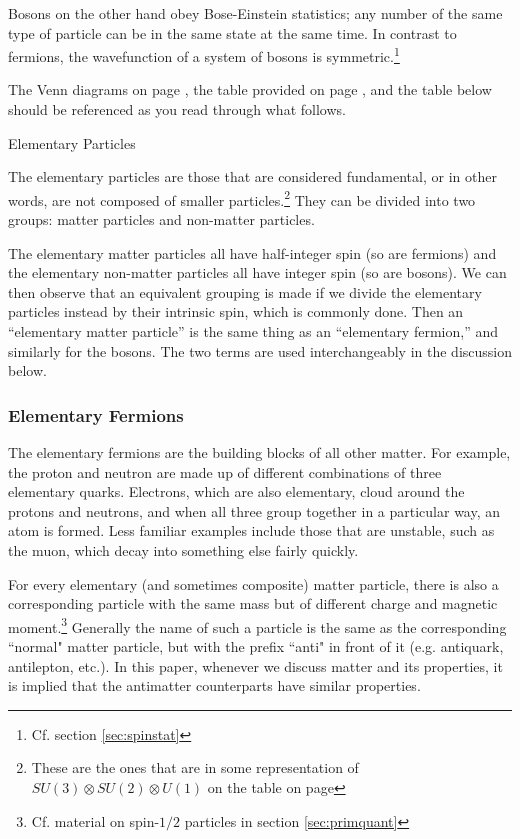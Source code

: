\documentclass[12pt,epsf]{article}
\makeatletter
\def\subsection{\@startsection{subsection}{2}{\z@}{2.3ex plus .2ex}
 {2.3ex plus .2ex}{\bf}}
\makeatother
\begin{document}
Bosons on the other hand obey Bose-Einstein statistics; any number of
the same type of particle can be in the same state at the same time. 
In contrast to fermions, the wavefunction of a system of bosons is
symmetric.\footnote{Cf. section \ref{sec:spinstat}}

The Venn diagrams on page \pageref{venn}, the table provided on page
\pageref{standardmodelsummary}, 
and the table below should be referenced as you read through what
follows. 

\subsection{Elementary Particles}

The elementary particles are those that are considered fundamental, or
in other words, are not composed of smaller particles.\footnote{These
are the ones that are in some representation of $SU(3)\otimes
SU(2)\otimes U(1)$ on the table on page
\pageref{standardmodelsummary}}  They can be divided into two groups:
matter particles and non-matter particles. 

The elementary matter particles all have half-integer spin (so are
fermions) and the elementary non-matter particles all have integer spin
(so are bosons). We can then observe that an equivalent grouping is
made if we divide the elementary particles instead by their intrinsic
spin, which is commonly done. Then an “elementary matter particle” is
the same thing as an “elementary fermion,” and similarly for the
bosons. The two terms are used interchangeably in the discussion below. 

\subsubsection{Elementary Fermions}
The elementary fermions are the building blocks of all other matter.
For example, the proton and neutron are made up of different
combinations of three elementary quarks. Electrons, which are also
elementary, cloud around the protons and neutrons, and when all three
group together in a particular way, an atom is formed. Less familiar
examples include those that are unstable, such as the muon, which decay
into something else fairly quickly. 

For every elementary (and sometimes composite) matter particle, there
is also a corresponding particle with the same mass but of different
charge and magnetic moment.\footnote{Cf. material on spin-$1/2$
particles in section \ref{sec:primquant}} Generally the name of such a
particle is the same as the corresponding ``normal" matter particle,
but with the prefix ``anti" in front of it (e.g. antiquark, antilepton,
etc.). In this paper, whenever we discuss matter
and its properties, it is implied that the antimatter
counterparts have similar properties.
\end{document}
